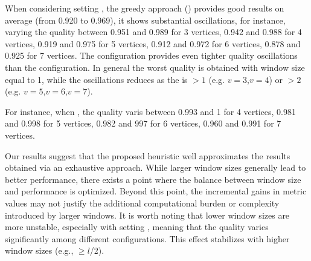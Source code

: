   When considering setting \average, the greedy approach () provides good results on average (from 0.920 to 0.969), it shows substantial oscillations, for instance, varying the quality between 0.951 and 0.989 for 3 vertices, 0.942 and 0.988 for 4 vertices, 0.919 and 0.975 for 5 vertices, 0.912 and 0.972 for 6 vertices, 0.878 and 0.925 for 7 vertices. The \average configuration provides even tighter quality oscillations than the \wide configuration. In general the worst quality is obtained with window size equal to 1, while the oscillations reduces as the \windowsize is $>1$ (e.g. $v=3$,$v=4$) or $>2$ (e.g. $v=5$,$v=6$,$v=7$).

  For instance, when , the quality varis between  0.993 and 1 for 4 vertices, 0.981 and 0.998 for 5 vertices, 0.982 and 997 for 6 vertices, 0.960 and 0.991 for 7 vertices.


  Our results suggest that the proposed heuristic well approximates the results obtained via an exhaustive approach. While larger window sizes generally lead to better performance, there exists a point where the balance between window size and performance is optimized. Beyond this point, the incremental gains in metric values may not justify the additional computational burden or complexity introduced by larger windows. It is worth noting that lower window sizes are more unstable, especially with setting \wide, meaning that the quality varies significantly among different configurations. This effect stabilizes with higher window sizes (e.g., \windowsize$\geq$$l$/2).

